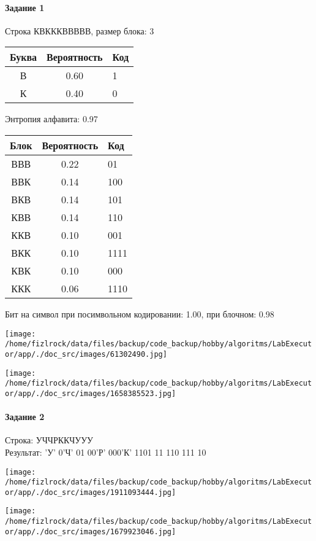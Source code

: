 \documentclass[a4paper, 12pt]{article}
\begin{document}
\paragraph{Задание 1}

Строка КВКККВВВВВ, размер блока: 3
\begin{center}
 \begin{tabular}{ |c|c|l| } 
  \hline
     Буква & Вероятность & Код\\ \hline
В & 0.60 & 1\\\hline
К & 0.40 & 0
\\ \hline \end{tabular}
\end{center}
Энтропия алфавита: 0.97
\begin{center}
 \begin{tabular}{ |c|c|l| } 
  \hline
     Блок & Вероятность & Код\\ \hline
ВВВ & 0.22 & 01\\\hline
ВВК & 0.14 & 100\\\hline
ВКВ & 0.14 & 101\\\hline
КВВ & 0.14 & 110\\\hline
ККВ & 0.10 & 001\\\hline
ВКК & 0.10 & 1111\\\hline
КВК & 0.10 & 000\\\hline
ККК & 0.06 & 1110
\\ \hline \end{tabular}
\end{center}
Бит на символ при посимвольном кодировании: 1.00, при блочном: 0.98

\texttt{[image: /home/fizlrock/data/files/backup/code\_backup/hobby/algoritms/LabExecutor/app/./doc\_src/images/61302490.jpg]}

\texttt{[image: /home/fizlrock/data/files/backup/code\_backup/hobby/algoritms/LabExecutor/app/./doc\_src/images/1658385523.jpg]}
\pagebreak
\paragraph{Задание 2}

Строка: 
УЧЧРККЧУУУ\\
Результат: 'У' 0'Ч' 01 00'Р' 000'К' 1101 11 110 111 10

\texttt{[image: /home/fizlrock/data/files/backup/code\_backup/hobby/algoritms/LabExecutor/app/./doc\_src/images/1911093444.jpg]}

\texttt{[image: /home/fizlrock/data/files/backup/code\_backup/hobby/algoritms/LabExecutor/app/./doc\_src/images/1679923046.jpg]}
\end{document}
